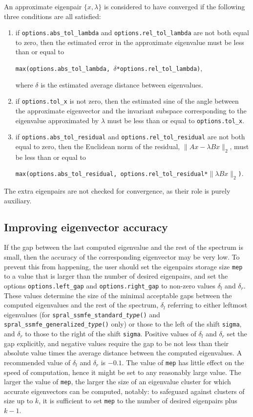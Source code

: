 An approximate eigenpair 
$\{x,\lambda\}$ is considered to have converged
if %
the following three conditions are all satisfied:
%
\begin{enumerate}
%
\item
if {\tt options.abs\_tol\_lambda} and 
{\tt options.rel\_tol\_lambda}
are not both equal to zero, then
the estimated error in the approximate eigenvalue
must be less than or equal to

{\tt max(options.abs\_tol\_lambda, 
$\delta$*options.rel\_tol\_lambda)},

where $\delta$ is the estimated average distance
between eigenvalues.
\item
if {\tt options.tol\_x} is not zero, then
the estimated sine of the angle between
the approximate eigenvector and the invariant subspace
corresponding to the eigenvalue 
approximated by $\lambda$
must be less than or equal to {\tt options.tol\_x}.
\item
if {\tt options.abs\_tol\_residual} and 
{\tt options.rel\_tol\_residual}
are not both equal to zero, then
the Euclidean norm of the residual,
$\|A x - \lambda B x\|_2$,
must be less than or equal to

{\tt max(options.abs\_tol\_residual, 
options.rel\_tol\_residual*$\|\lambda B x\|_2$)}.
%
\end{enumerate}
%
The extra eigenpairs are not checked for convergence,
as their role is purely auxiliary.

\subsection{Improving eigenvector accuracy}

If the gap %
between the last computed eigenvalue 
and the rest of the spectrum is small,
then the accuracy of the corresponding eigenvector may be very low.
To prevent this from happening,
the user should set the eigenpairs storage size {\tt mep}
to a value that is larger than the number of desired eigenpairs,
and set the options 
{\tt options.left\_gap}
and
{\tt options.right\_gap}
to non-zero values $\delta_l$ and $\delta_r$.
These values
determine the size of the minimal acceptable gaps
between the computed eigenvalues and the rest of the spectrum,
$\delta_l$ referring to either leftmost eigenvalues
(for {\tt spral\_ssmfe\_standard\_\textit{type}()} and {\tt spral\_ssmfe\_generalized\_\textit{type}()} only)
or those to the left of the shift {\tt sigma},
and $\delta_r$
to those to the right of the shift {\tt sigma}.
Positive values of $\delta_l$ and $\delta_r$
set the gap explicitly,
and negative values
require the gap to be not less than their absolute value times
the average distance between the computed eigenvalues.
A recommended value of $\delta_l$ and $\delta_r$ is $-0.1$.
The value of {\tt mep} %
has little effect on
the speed of computation,
hence it might be set to any reasonably large value.
The larger the value of {\tt mep}, 
the larger the size of an eigenvalue cluster
for which accurate eigenvectors can be computed, notably:
to safeguard against clusters of size up to $k$,
it is sufficient to set {\tt mep} to the number of desired eigenpairs
plus $k - 1$.

